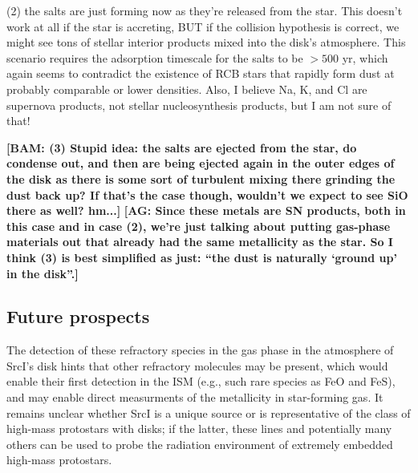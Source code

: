 \documentclass[twocolumn]{aastex62}
\newcommand{\sourcei}{SrcI\xspace}
\newcommand{\bam}[1]{\textcolor{green!65!black}{\textbf{[BAM: #1]}}}
\newcommand{\ag}[1]{\textcolor{red!65!black}{\textbf{[AG: #1]}}}
\begin{document}
(2) the salts are just forming now as they’re released from the star.  This
doesn’t work at all if the star is accreting, BUT if the collision hypothesis
is correct, we might see tons of stellar interior products mixed into the
disk’s atmosphere.  This scenario requires the adsorption timescale for the
salts to be $>500$ yr, which again seems to contradict the existence of RCB
stars that rapidly form dust at probably comparable or lower densities.
Also, I believe Na, K, and Cl are supernova products, not stellar nucleosynthesis
products, but I am not sure of that!

\bam{(3) Stupid idea: the salts are ejected from the star, do condense out, and
then are being ejected again in the outer edges of the disk as there is some
sort of turbulent mixing there grinding the dust back up?  If that's the case
though, wouldn't we expect to see SiO there as well? hm...}
\ag{Since these metals are SN products, both in this case and in case (2),
we're just talking about putting gas-phase materials out that already
had the same metallicity as the star.  So I think (3) is best simplified
as just: ``the dust is naturally `ground up' in the disk''.}

\subsection{Future prospects}
The detection of these refractory species in the gas phase in the atmosphere
of \sourcei's disk hints that other refractory molecules may be present, 
which would enable their first detection in the ISM (e.g., such rare species as
FeO and FeS), and may enable direct measurments of the metallicity in
star-forming gas.
It remains unclear whether \sourcei is a unique source or is representative
of the class of high-mass protostars with disks; if the latter, these lines
and potentially many others can be used to probe the radiation environment of 
extremely embedded high-mass protostars.
\end{document}

